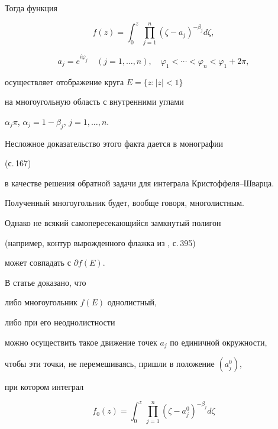 

Тогда функция


\begin{equation}


f(z)=\int_{0}^{z}\,


\prod_{j=1}^{n}(\zeta-a_{j})^{-\beta_{j}}d\zeta,


\end{equation}


%


$$


a_{j}=e^{i\varphi_{j}} \quad


(j=1,\dotsc,n),\quad


%


\varphi_{1}<\dotsb <\varphi_{n}<\varphi_{1}+2\pi,


$$




осуществляет отображение круга $E=\{ z:|z|<1\}$


на многоугольную область с внутренними углами


$\alpha_{j}\pi$, $\alpha_{j}=1-\beta_{j}$, $j=1,\dotsc,n$.





Несложное доказательство этого факта дается в монографии


\cite{Lav} (с.\,167)


в качестве решения обратной задачи для интеграла Крис\-тоф\-фе\-ля--Швар\-ца.


Полученный многоугольник будет, вообще говоря, многолистным.


Однако не всякий самопересекающийся замкнутый полигон


(например, контур вырожденного флажка из \cite{Pri}, с.\,395)


может совпадать с $\partial f(E)$.





В статье \cite{Av} доказано, что


либо многоугольник $f(E)$ однолистный,


либо при его неоднолистности


можно осуществить такое движение точек $a_{j}$ по единичной окружности,


чтобы эти точки, не перемешиваясь, пришли в положение $(a_{j}^{0})$,


при котором интеграл


\begin{equation}


f_{0}(z)=\int_{0}^{z}\,


\prod_{j=1}^{n}(\zeta-a_{j}^{0})^{-\beta_{j}}


d\zeta


\end{equation}


